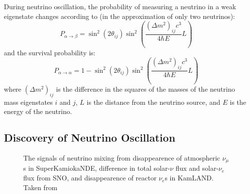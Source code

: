 \documentclass[/main.tex]{subfiles}
\begin{document}
During neutrino oscillation, the probability of measuring a neutrino in a weak eigenstate changes according to (in the approximation of only two neutrinos):
\begin{equation}
  P_{\alpha\rightarrow\beta}=\sin^2(2\theta_{ij})\sin^2(\frac{(\Delta m^2)_{ij}c^3}{4\hbar E}L)
\end{equation}
and the survival probability is:
\begin{equation}
  P_{\alpha\rightarrow\alpha}=1-\sin^2(2\theta_{ij})\sin^2(\frac{(\Delta m^2)_{ij}c^3}{4\hbar E}L)
\end{equation}
where $(\Delta m^2)_{ij}$ is the difference in the squares of the masses of the neutrino mass eigenstates $i$ and $j$, $L$ is the distance from the neutrino source, and $E$ is the energy of the neutrino.

\subsection{Discovery of Neutrino Oscillation}
\begin{figure}[t]
  \centering
  \caption[Confirmation of Neutrino Oscillation]{\label{fig:nuoscillation}
    The signals of neutrino mixing from disappearence of atmospheric $\nu_\mu$s in SuperKamiokaNDE, difference in total solar-$\nu$ flux and solar-$\nu_e$ flux from SNO, and disappearence of reactor $\nu_e$s in KamLAND. Taken from \cite{PDG2018}}
\end{figure}
\end{document}
